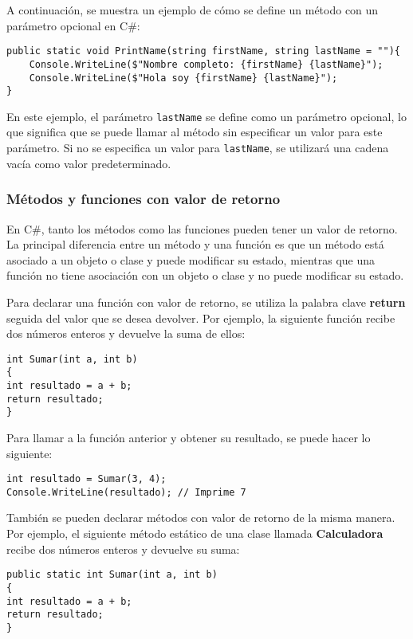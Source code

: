 \documentclass[executivepaper]{article}
\begin{document}
A continuación, se muestra un ejemplo de cómo se define un método con un parámetro opcional en C\#:

\begin{lstlisting}
public static void PrintName(string firstName, string lastName = ""){
    Console.WriteLine($"Nombre completo: {firstName} {lastName}");
    Console.WriteLine($"Hola soy {firstName} {lastName}");
}
\end{lstlisting}

En este ejemplo, el parámetro \texttt{lastName} se define como un parámetro opcional, lo que significa que se puede llamar al método sin especificar un valor para este parámetro. Si no se especifica un valor para \texttt{lastName}, se utilizará una cadena vacía como valor predeterminado.

\subsubsection*{Métodos y funciones con valor de retorno}

En C\#, tanto los métodos como las funciones pueden tener un valor de retorno. La principal diferencia entre un método y una función es que un método está asociado a un objeto o clase y puede modificar su estado, mientras que una función no tiene asociación con un objeto o clase y no puede modificar su estado.

Para declarar una función con valor de retorno, se utiliza la palabra clave \textbf{return} seguida del valor que se desea devolver. Por ejemplo, la siguiente función recibe dos números enteros y devuelve la suma de ellos:

\begin{lstlisting}[language={[Sharp]C}]
int Sumar(int a, int b)
{
int resultado = a + b;
return resultado;
}
\end{lstlisting}

Para llamar a la función anterior y obtener su resultado, se puede hacer lo siguiente:

\begin{lstlisting}[language={[Sharp]C}]
int resultado = Sumar(3, 4);
Console.WriteLine(resultado); // Imprime 7
\end{lstlisting}

También se pueden declarar métodos con valor de retorno de la misma manera. Por ejemplo, el siguiente método estático de una clase llamada \textbf{Calculadora} recibe dos números enteros y devuelve su suma:

\begin{lstlisting}[language={[Sharp]C}]
public static int Sumar(int a, int b)
{
int resultado = a + b;
return resultado;
}
\end{lstlisting}
\end{document}
